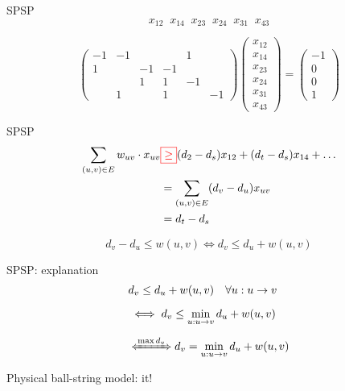 \begin{frame}{SPSP}
  \[
	x_{12}\;\; x_{14}\;\;	x_{23}\;\;	x_{24}\;\;	x_{31}\;\;	x_{43}
  \]

  \begin{equation*}
	\begin{pmatrix}
	  -1	&	-1	&	&	&	1	&	\\
	  1		&		&	-1	&	-1	&	\\
	  		&		&	1	&	1	&	-1	\\
	 		&	1	&	&	1	&	&	-1
	\end{pmatrix}
	\begin{pmatrix}
	  x_{12}\\x_{14}\\x_{23}\\x_{24}\\x_{31}\\x_{43}
	\end{pmatrix}
	= 
	\begin{pmatrix}
	  -1\\0\\0\\1
	\end{pmatrix}
  \end{equation*}
\end{frame}
\begin{frame}{SPSP}
  \begin{align*}
	\sum_{(u,v) \in E} w_{uv} \cdot x_{uv} & \textcolor{red}{\boxed{\geq}} (d_2 - d_s) x_{12} + (d_t - d_s) x_{14} + \dots	\\
	&	=	\sum_{(u,v) \in E} (d_v - d_u) x_{uv}	\\
	&	=	d_t - d_s
  \end{align*}

  \[
	d_v - d_u \leq w(u,v) \iff d_v \leq d_u + w(u,v)
  \]
\end{frame}
\begin{frame}{SPSP: explanation}
  \begin{align*}
	&	d_v \leq d_u + w(u,v)	\quad \forall u: u \to v	\\[6pt]
	& 	\iff	d_v \leq \min_{u: u \to v} d_u + w(u,v)	\\[6pt]
	&	\xLeftrightarrow{\max d_v}	d_v = \min_{u: u \to v} d_u + w(u,v)
  \end{align*}

  \vspace{0.50cm}

  \begin{center}
	Physical ball-string model:  it!
  \end{center}
\end{frame}
